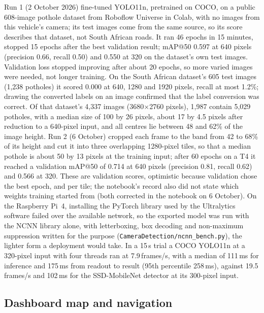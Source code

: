 Run 1 (2 October 2026) fine-tuned YOLO11n, pretrained on COCO, on a public 608-image pothole dataset from Roboflow Universe \cite{gerapothole} in Colab, with no images from this vehicle's camera; its test images come from the same source, so its score describes that dataset, not South African roads. It ran 46 epochs in 15 minutes, stopped 15 epochs after the best validation result; mAP@50 0.597 at 640 pixels (precision 0.66, recall 0.50) and 0.550 at 320 on the dataset's own test images. Validation loss stopped improving after about 20 epochs, so more varied images were needed, not longer training. On the South African dataset's 605 test images (1,238 potholes) it scored 0.000 at 640, 1280 and 1920 pixels, recall at most 1.2\%; drawing the converted labels on an image confirmed that the label conversion was correct. Of that dataset's 4,337 images (3680$\times$2760 pixels), 1,987 contain 5,029 potholes, with a median size of 100 by 26 pixels, about 17 by 4.5 pixels after reduction to a 640-pixel input, and all centres lie between 48 and 62\% of the image height. Run 2 (6 October) cropped each frame to the band from 42 to 68\% of its height and cut it into three overlapping 1280-pixel tiles, so that a median pothole is about 50 by 13 pixels at the training input; after 60 epochs on a T4 it reached a validation mAP@50 of 0.714 at 640 pixels (precision 0.81, recall 0.62) and 0.566 at 320. These are validation scores, optimistic because validation chose the best epoch, and per tile; the notebook's record also did not state which weights training started from (both corrected in the notebook on 6 October). On the Raspberry Pi~4, installing the PyTorch library used by the Ultralytics software failed over the available network, so the exported model was run with the NCNN library alone, with letterboxing, box decoding and non-maximum suppression written for the purpose (\texttt{CameraDetection/\allowbreak{}ncnn\_\allowbreak{}bench.py}), the lighter form a deployment would take. In a 15\,s trial a COCO YOLO11n at a 320-pixel input with four threads ran at 7.9\,frames/s, with a median of 111\,ms for inference and 175\,ms from readout to result (95th percentile 258\,ms), against 19.5\,frames/s and 102\,ms for the SSD-MobileNet detector at its 300-pixel input.

\subsection*{Dashboard map and navigation}

